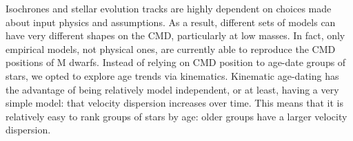 Isochrones and stellar evolution tracks are highly dependent on choices made
about input physics and assumptions.
As a result, different sets of models can have very different shapes on the
CMD, particularly at low masses.
In fact, only empirical models, not physical ones, are currently able to
reproduce the CMD positions of M dwarfs.
Instead of relying on CMD position to age-date groups of stars, we opted to
explore age trends via kinematics.
Kinematic age-dating has the advantage of being relatively model independent,
or at least, having a very simple model: that velocity dispersion increases
over time.
This means that it is relatively easy to rank groups of stars by age: older
groups have a larger velocity dispersion.
